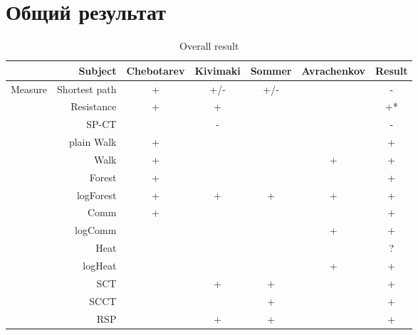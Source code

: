 \documentclass{article}
\begin{document}
\section*{Общий результат}

\begin{table}[H]
\centering
\caption{Overall result}
\label{my-label}
\begin{tabular}{rr|cccc|c}
                & Subject                        & Chebotarev & Kivimaki & Sommer & Avrachenkov & Result \\
                \hline
Measure         & Shortest path                  & +          & \cellcolor{red!25} +/- & \cellcolor{red!25} +/- & & \cellcolor{red!25} - \\
                & Resistance            & +          & +        &        &             &  \cellcolor{yellow!25} +* \\
                & SP-CT              &            & \cellcolor{red!25} - & & & \cellcolor{red!25} - \\
                & plain Walk                     & +          &          &        &             & +      \\
                & Walk                           & +          &          &        & +           & +      \\
                & Forest                         & +          &          &        &             & +      \\
                & logForest                      & +          & +        & +      & +           & +      \\
                & Comm                & +          &          &        &             & +      \\
                & logComm             &            &          &        & +           & +      \\
                & Heat                           &            &          &        &             & ?      \\
                & logHeat                        &            &          &        & +           & +      \\
                & SCT                            &            & +        & +      &             & +      \\
                & SCCT                           &            &          & +      &             & +      \\
                & RSP                            &            & +        & +      &             & +      \\

\end{tabular}
\end{table}
\end{document}
